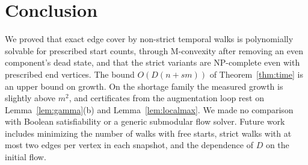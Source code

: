 \section{Conclusion}\label{sec:conclusion}

We proved that exact edge cover by non-strict temporal walks is polynomially solvable for prescribed start counts, through M-convexity after removing an even component's dead state, and that the strict variants are NP-complete even with prescribed end vertices. The bound $O(D(n+sm))$ of Theorem~\ref{thm:time} is an upper bound on growth. On the shortage family the measured growth is slightly above $m^2$, and certificates from the augmentation loop rest on Lemma~\ref{lem:gamma}(b) and Lemma~\ref{lem:localmax}. We made no comparison with Boolean satisfiability or a generic submodular flow solver. Future work includes minimizing the number of walks with free starts, strict walks with at most two edges per vertex in each snapshot, and the dependence of $D$ on the initial flow.

\backmatter
